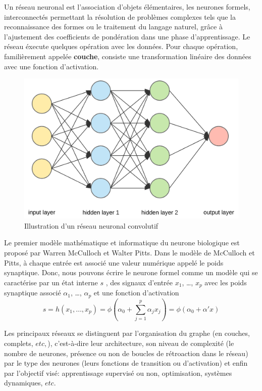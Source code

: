 \documentclass[
  12pt,
  dvipsnames]{article}
\begin{document}
Un réseau neuronal est l'association d'objets élémentaires, les neurones formels, interconnectés permettant la résolution de problèmes complexes tels que la reconnaissance des formes ou le traitement du langage naturel,
grâce à l'ajustement des coefficients de pondération dans une phase d'apprentissage. Le réseau éxecute quelques opération avec les données. Pour chaque opération, familièrement appelée \textbf{couche}, consiste une transformation linéaire des données avec une fonction d'activation.

\begin{figure}

{\centering \includegraphics{../res/cnn} 

}

\caption{Illustration d'un réseau neuronal convolutif}\label{fig:cnn-model}
\end{figure}

Le premier modèle mathématique et informatique du neurone biologique est proposé par Warren McCulloch et Walter Pitts. Dans le modèle de McCulloch et Pitts, à chaque entrée est associé une valeur numérique appelé le poids synaptique.
Donc, nous pouvons écrire le neurone formel comme un modèle qui se caractérise par
un état interne \(s\) , des signaux d'entrée \(x_{1}\), \dots, \(x_{p}\) avec les poids synaptique associé
\(\alpha_{1}\), \dots, \(\alpha_{p}\) et une fonction d'activation
\[ s=h(x_{1},\dots,x_{p})=\phi(\alpha_{0} + \sum_{j=1}^{p} \alpha_{j}x_{j}) = \phi(\alpha_{0} + \alpha' x)\]

Les principaux réseaux se distinguent par l'organisation du graphe (en couches, complets, \(etc,\)), c'est-à-dire leur architecture, son niveau de complexité (le nombre de neurones, présence ou non de boucles de rétroaction dans le réseau) par le type des neurones (leurs fonctions de transition ou d'activation) et enfin par l'objectif visé: apprentissage supervisé ou non, optimisation, systèmes dynamiques, \(etc.\)
\end{document}
